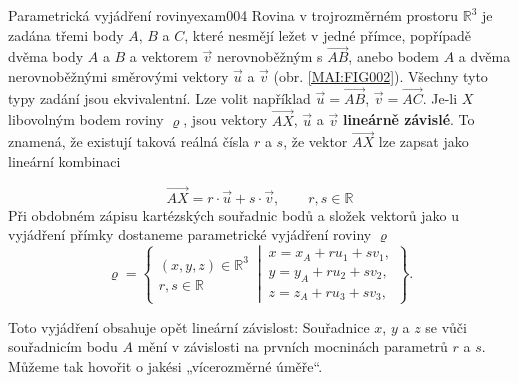 \begin{mathexam}{Parametrická vyjádření roviny}{exam004}
  Rovina v trojrozměrném prostoru \(\mathbb{R}^3\) je zadána třemi body \(A\), \(B\) a \(C\), které
  nesmějí ležet v jedné přímce, popřípadě dvěma body \(A\) a \(B\) a vektorem \(\vec{v}\)
  nerovnoběžným s \(\overrightarrow{AB}\), anebo bodem \(A\) a dvěma nerovnoběžnými směrovými
  vektory \(\vec{u}\) a \(\vec{v}\) (obr. \ref{MAI:FIG002}). Všechny tyto typy zadání jsou
  ekvivalentní. Lze volit například \(\vec{u} = \overrightarrow{AB}\), \(\vec{v} =
  \overrightarrow{AC}\). Je-li \(X\) libovolným bodem roviny \(\varrho\), jsou vektory
  \(\overrightarrow{AX}\), \(\vec{u}\) a \(\vec{v}\) \textbf{lineárně závislé}. To znamená, že
  existují taková reálná čísla \(r\) a \(s\), že vektor \(\overrightarrow{AX}\) lze zapsat jako
  lineární kombinaci

  \begin{equation*}
    \overrightarrow{AX} = r\cdot\vec{u} + s\cdot\vec{v}, \qquad r,s \in\mathbb{R}
  \end{equation*}
  Při obdobném zápisu kartézských souřadnic bodů a složek vektorů jako u vyjádření přímky dostaneme
  parametrické vyjádření roviny \(\varrho\)
  \begin{equation*}
    \varrho = \left\{
    \begin{matrix}  
      (x,y,z)\in\mathbb{R}^3  \\
      r, s \in\mathbb{R}
    \end{matrix}
    \,\left\lvert\,
    \begin{matrix}
      x = x_A + ru_1 + sv_1,        \\
      y = y_A + ru_2 + sv_2,        \\
      z = z_A + ru_3 + sv_3,
    \end{matrix}\right.          
    \right\}.
  \end{equation*} 

  { \centering
    \captionsetup{type=figure}
     \par}

  Toto vyjádření obsahuje opět lineární závislost: Souřadnice \(x\), \(y\) a \(z\) se vůči
  souřadnicím bodu \(A\) mění v závislosti na prvních mocninách parametrů \(r\) a \(s\). Můžeme tak
  hovořit o jakési „vícerozměrné úměře“.
\end{mathexam}
  